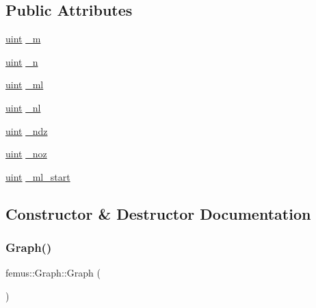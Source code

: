 \subsection*{Public Attributes}
\begin{DoxyCompactItemize}
\item 
\mbox{\hyperlink{_typedefs_8hpp_a91ad9478d81a7aaf2593e8d9c3d06a14}{uint}} \mbox{\hyperlink{classfemus_1_1_graph_accb66f9d0bb76b2768cc704ead6e9261}{\+\_\+m}}
\item 
\mbox{\hyperlink{_typedefs_8hpp_a91ad9478d81a7aaf2593e8d9c3d06a14}{uint}} \mbox{\hyperlink{classfemus_1_1_graph_acd9ea1db225a7c920c0de062e7ea5385}{\+\_\+n}}
\item 
\mbox{\hyperlink{_typedefs_8hpp_a91ad9478d81a7aaf2593e8d9c3d06a14}{uint}} \mbox{\hyperlink{classfemus_1_1_graph_ab1abf3fa412dce7099508e81c642bc06}{\+\_\+ml}}
\item 
\mbox{\hyperlink{_typedefs_8hpp_a91ad9478d81a7aaf2593e8d9c3d06a14}{uint}} \mbox{\hyperlink{classfemus_1_1_graph_afd61bb947a62a66e7ebba21fc2f77a94}{\+\_\+nl}}
\item 
\mbox{\hyperlink{_typedefs_8hpp_a91ad9478d81a7aaf2593e8d9c3d06a14}{uint}} \mbox{\hyperlink{classfemus_1_1_graph_a92e23143557b64fdb710d21f5effd322}{\+\_\+ndz}}
\item 
\mbox{\hyperlink{_typedefs_8hpp_a91ad9478d81a7aaf2593e8d9c3d06a14}{uint}} \mbox{\hyperlink{classfemus_1_1_graph_a9f279b883a6968c466b5ee756e9be9b1}{\+\_\+noz}}
\item 
\mbox{\hyperlink{_typedefs_8hpp_a91ad9478d81a7aaf2593e8d9c3d06a14}{uint}} \mbox{\hyperlink{classfemus_1_1_graph_a8a2f275212280bfbe63db693ab38f44e}{\+\_\+ml\+\_\+start}}
\end{DoxyCompactItemize}


\subsection{Constructor \& Destructor Documentation}
\mbox{\label{classfemus_1_1_graph_abdb1ed856833315bedbba9a7c78b6775}} 
\subsubsection{\texorpdfstring{Graph()}{Graph()}}
{\footnotesize\ttfamily femus\+::\+Graph\+::\+Graph (\begin{DoxyParamCaption}{ }\end{DoxyParamCaption})\hspace{0.3cm}{\ttfamily [inline]}}



